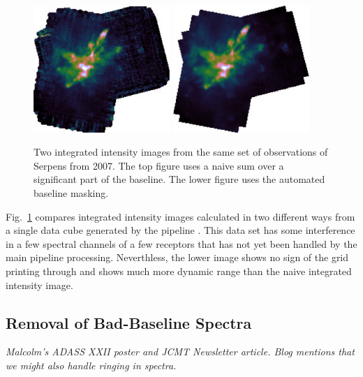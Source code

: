 \documentclass[final,authoryear,5p,times,twocolumn]{elsarticle}
\begin{document}
\begin{figure}
\includegraphics[width=0.46\textwidth]{integ_manual.pdf}
\includegraphics[width=0.46\textwidth]{integ_auto.pdf}
\caption{Two integrated intensity images from the same set of
  observations of Serpens from 2007. The top figure uses a naive sum
  over a significant part of the baseline. The lower figure uses the
  automated baseline masking.}
\label{fig:integ}
\end{figure}

Fig.\ \ref{fig:integ} compares integrated intensity images calculated
in two different ways from a single data cube generated by the
pipeline \citep[see][for details of earlier
reductions of these data]{2010MNRAS.409.1412G,2010A&A...523A..29D}. This data set
has some interference in a few spectral channels of a few receptors
that has not yet been handled by the main pipeline
processing. Neverthless, the lower image shows no sign of the grid
printing through and shows much more dynamic range than the naive
integrated intensity image.

\subsection{Removal of Bad-Baseline Spectra}



\textit{Malcolm's ADASS XXII poster and JCMT Newsletter article. Blog mentions
that we might also handle ringing in spectra.}
\end{document}
